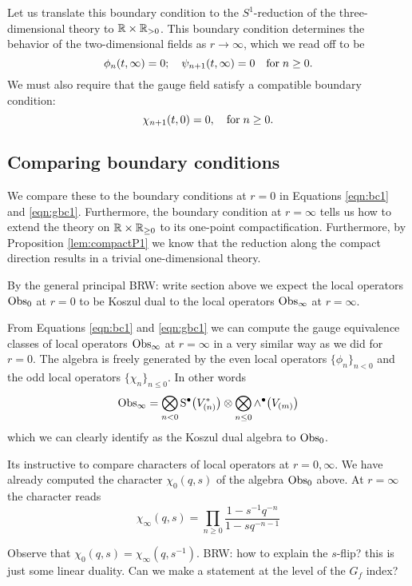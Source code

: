 \documentclass[11pt]{amsart}
\def\brian#1{{\textcolor{blue!65!red}{BRW: {#1}}}}
\begin{document}
Let us translate this boundary condition to the $S^1$-reduction of the three-dimensional theory to $\mathbb R \times \mathbb R_{>0}$. 
This boundary condition determines the behavior of the two-dimensional fields as $r \to \infty$, which we read off to be 
\begin{equation}\label{eqn:bc2}
\phi_n (t, \infty) = 0 ; \quad \psi_{n+1} (t, \infty) = 0 \quad {\rm for} \; n \geq 0 .
\end{equation}
We must also require that the gauge field satisfy a compatible boundary condition:
\begin{equation}\label{eqn:gbc2}
\chi_{n+1} (t,0) = 0, \quad {\rm for} \; n \geq 0 .
\end{equation}

\subsection*{Comparing boundary conditions}

We compare these to the boundary conditions at $r=0$ in Equations \eqref{eqn:bc1} and \eqref{eqn:gbc1}. 
Furthermore, the boundary condition at $r = \infty$ tells us how to extend the theory on $\mathbb R \times \mathbb R_{\geq 0}$ to its one-point compactification. 
Furthermore, by Proposition \ref{lem:compactP1} we know that the reduction along the compact direction results in a trivial one-dimensional theory.

By the general principal \brian{write section above} we expect the local operators ${\rm Obs}_0$ at $r = 0$ to be Koszul dual to the local operators ${\rm Obs}_\infty$ at $r = \infty$. 

From Equations \eqref{eqn:bc1} and \eqref{eqn:gbc1} we can compute the gauge equivalence classes of local operators ${\rm Obs}_\infty$ at $r = \infty$ in a very similar way as we did for $r = 0$. 
The algebra is freely generated by the even local operators $\{\phi_n\}_{n < 0}$ and the odd local operators $\{\chi_n\}_{n \leq 0}$. 
In other words
\[
{\rm Obs}_\infty = \bigotimes_{n < 0} {\rm S}^\bullet \big(V^*_{(n)}\big) \otimes \bigotimes_{n \leq 0} \wedge^\bullet \big(V_{(m)}\big)
\]
which we can clearly identify as the Koszul dual algebra to ${\rm Obs}_0$. 

Its instructive to compare characters of local operators at $r = 0, \infty$. 
We have already computed the character $\chi_0(q,s)$ of the algebra ${\rm Obs}_0$ above. 
At $r=\infty$ the character reads 
\[
\chi_\infty (q,s) = \prod_{n \geq 0} \frac{1 - s^{-1}q^{-n}}{1 - s q^{-n-1}}
\]

Observe that $\chi_0 (q,s) = \chi_\infty (q, s^{-1})$. 
\brian{how to explain the $s$-flip? this is just some linear duality. Can we make a statement at the level of the $G_f$ index?}
\end{document}
